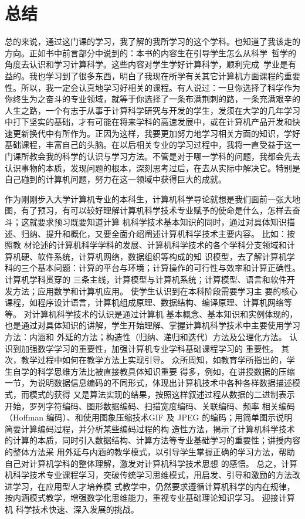\documentclass{article}
\begin{document}
\section{总结}
总的来说，通过这门课的学习，我了解的我所学习的这个学科。也知道了我该走的方向。正如书中前言部分中说到的：本书的内容生在引导学生怎么从科学 哲学的角度去认识和学习计算科学。这些内容对学生学好计算科学，顺利完成 学业是有益的。我也学习到了很多东西，明白了我现在所学有关其它计算机方面课程的重要性。所以，我一定会认真地学习好相关的课程。有人说过：一旦你选择了科学作为你终生为之奋斗的专业领域，就等于你选择了一条布满荆刺的路，一条充满艰辛的人生之路，一个有志于从事于计算科学研究与开发的学生，发须在大学的几年学习中打下坚实的基础，才有可能在将来学科的高速发展中，或在计算机产品开发和快速更新换代中有所作为。正因为这样，我要更加努力地学习相关方面的知识，学好基础课程，丰富自己的头脑。在以后相关专业的学习过程中，我将一直受益于这一门课所教会我的科学的认识与学习方法。不管是对于哪一学科的问题，我都会先去认识事物的本质，发现问题的根本，深刻思考过后，在去从实际中解决它。特别是自己碰到的计算机问题，努力在这一领域中获得巨大的成就。

作为刚刚步入大学计算机专业的本科生，计算机科学导论就想是我们面前一张大地图，有了预习，有可以较好理解计算机科学技术专业赋予的使命是什么，怎样去奋斗；这就要求预习既要知道计算 机科学技术基本知识的同时，通过对具体知识描述、归纳、提升和概化，又要全面介绍阐述计算机科学技术主要内容。 比如：按照教 材论述的计算机科学学科的发展、计算机科学技术的各个学科分支领域和计算机硬、软件系统，计算机网络，数据组织等构成的知 识模型，去了解计算机学科的三个基本问题：计算的平台与环境；计算操作的可行性与效率和计算正确性。 计算机学科贯穿的 三条主线，计算模型与计算机系统；计算模型、语言和软件开发方法；应用数学和计算机应用。 使学生认识到在本科阶段需要学习主 要的核心课程，如程序设计语言，计算机组成原理、数据结构、编译原理、计算机网络等等。 对计算机科学技术的认识是通过计算机 基本概念、基本知识和实例体现的，也是通过对具体知识的讲解，学生开始理解、掌握计算机科学技术中主要使用学习方法：内涵和 外延的方法；构造性（归纳、递归和迭代）方法及公理化方法。 认识到加强数学学习的重要性，加强计算机专业学科基础课程学习的 重要性。 其次，教学过程中如何在教学方法上实现引导。 众所周知，如教育学所指出的，学生自学的科学思维方法比被直接教具体知识重要 得多，例如，在讲授数据的压缩一节，为说明数据信息编码的不同形式，体现出计算机技术中各种各样数据描述模式，而模式的获得 又是算法实现的结果，按照这样叙述过程从数据的二进制表示开始，罗列字符编码、图形数据编码、扫描宽度编码、关联编码、频率 相关编码（Hoffman 编码）、和使用图象压缩技术GIF 及 JPEG 的编码；用简单图示说明简要计算编码过程，并分析某些编码过程的构 造性方法，揭示了计算机科学技术的计算的本质，同时引入数据结构、计算方法等专业基础学习的重要性；讲授内容的整体方法采 用外延与内涵的教学模式，以引导学生掌握正确的学习方法，帮助自己对计算机学科的整体理解，激发对计算机科学技术思想 的感悟。 
总之，计算机科学技术专业课程学习，突破传统学习思维模式，用启发、引导和激励的方法改进学习，在应用型人才培养模 式教学中，仍然要求遵循计算机科学的内在规律，按内涵模式教学，增强数学化思维能力，重视专业基础理论知识学习。 迎接计算机 科学技术快速、深入发展的挑战。
\end{document}
